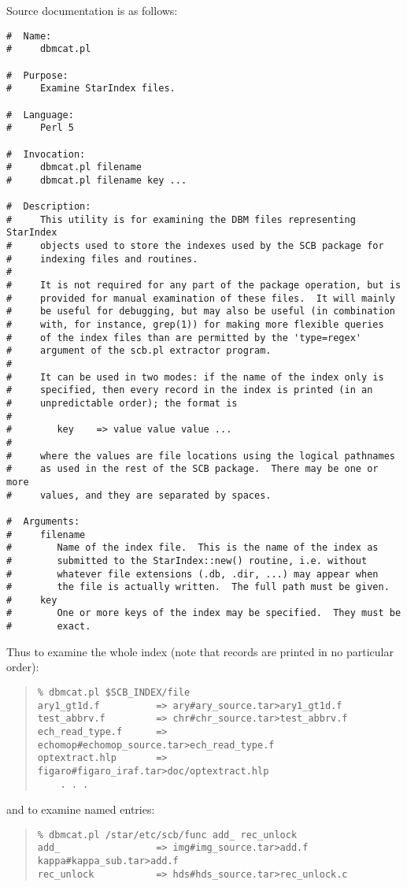 \documentclass[twoside,11pt]{article}
\renewcommand{\_}{\texttt{\symbol{95}}}
\begin{document}
Source documentation is as follows:
\begin{verbatim}
#  Name:
#     dbmcat.pl

#  Purpose:
#     Examine StarIndex files.

#  Language:
#     Perl 5

#  Invocation:
#     dbmcat.pl filename
#     dbmcat.pl filename key ...

#  Description:
#     This utility is for examining the DBM files representing StarIndex
#     objects used to store the indexes used by the SCB package for
#     indexing files and routines.
#
#     It is not required for any part of the package operation, but is
#     provided for manual examination of these files.  It will mainly
#     be useful for debugging, but may also be useful (in combination
#     with, for instance, grep(1)) for making more flexible queries
#     of the index files than are permitted by the 'type=regex'
#     argument of the scb.pl extractor program.
#
#     It can be used in two modes: if the name of the index only is
#     specified, then every record in the index is printed (in an
#     unpredictable order); the format is
#
#        key    => value value value ...
#
#     where the values are file locations using the logical pathnames
#     as used in the rest of the SCB package.  There may be one or more
#     values, and they are separated by spaces.

#  Arguments:
#     filename
#        Name of the index file.  This is the name of the index as
#        submitted to the StarIndex::new() routine, i.e. without
#        whatever file extensions (.db, .dir, ...) may appear when
#        the file is actually written.  The full path must be given.
#     key
#        One or more keys of the index may be specified.  They must be
#        exact.
\end{verbatim}
Thus to examine the whole index (note that records are printed in
no particular order):
\begin{quote}
\begin{verbatim}
% dbmcat.pl $SCB_INDEX/file
ary1_gt1d.f          => ary#ary_source.tar>ary1_gt1d.f
test_abbrv.f         => chr#chr_source.tar>test_abbrv.f
ech_read_type.f      => echomop#echomop_source.tar>ech_read_type.f
optextract.hlp       => figaro#figaro_iraf.tar>doc/optextract.hlp
    . . .
\end{verbatim}
\end{quote}
and to examine named entries:
\begin{quote}
\begin{verbatim}
% dbmcat.pl /star/etc/scb/func add_ rec_unlock
add_                 => img#img_source.tar>add.f kappa#kappa_sub.tar>add.f
rec_unlock           => hds#hds_source.tar>rec_unlock.c
\end{verbatim}
\end{quote}
\end{document}
